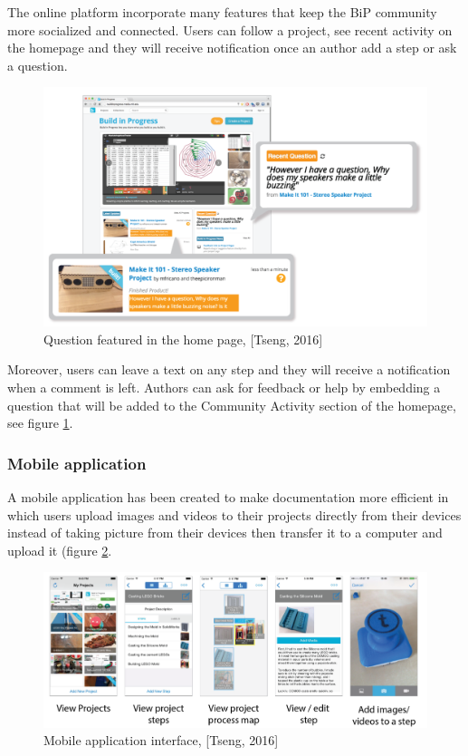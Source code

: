 The online platform incorporate many features that keep the BiP community more socialized and connected. Users can follow a project, see recent activity on the homepage and they will receive notification once an author add a step or ask a question.
\begin{figure}[H]
	\centering
	\includegraphics[scale=.4]{./images/img-commentquestion.png}
	\caption{Question featured in the home page, [Tseng, 2016]} 
	\label{img-commentquestion}
\end{figure}

Moreover, users can leave a text on any step and they will receive a notification when a comment is left. Authors can ask for feedback or help by embedding a question that will be added to the Community Activity section of the homepage, see figure \ref{img-commentquestion}.
\subsubsection{Mobile application}
A mobile application has been created to make documentation more efficient in which users upload images and videos to their projects directly from their devices instead of taking picture from their devices then transfer it to a computer and upload it (figure \ref{img-mobileapp}.
\begin{figure}[H]
	\centering
	\includegraphics[scale=.5]{./images/img-mobileapp.png}
	\caption{Mobile application interface, [Tseng, 2016]} 
	\label{img-mobileapp}
\end{figure}
